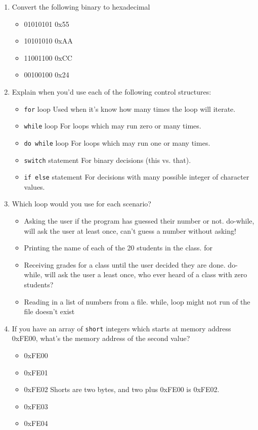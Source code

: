 \documentclass[letter,11pt]{article}
\newcommand*\tick{\item[\Checkmark]}
\newcommand*\fail{\item[\XSolidBrush]}
\begin{document}
\begin{enumerate}
    \item Convert the following binary to hexadecimal
    \begin{itemize}
        \item 01010101 {\color{red}0x55}
        \item 10101010 {\color{red}0xAA}
        \item 11001100 {\color{red}0xCC}
        \item 00100100 {\color{red}0x24}
    \end{itemize}
    
    \item Explain when you'd use each of the following control structures:
    \begin{itemize}
        \item \texttt{for} loop {\color{red}Used when it's know how many times the loop will iterate.}
        \item \texttt{while} loop {\color{red}For loops which may run zero or many times.}
        \item \texttt{do while} loop {\color{red}For loops which may run one or many times.}
        \item \texttt{switch} statement {\color{red}For binary decisions (this vs. that).}
        \item \texttt{if else} statement {\color{red}For decisions with many possible integer of character values.}
    \end{itemize}
    
    \item Which loop would you use for each scenario?
    \begin{itemize}
        \item Asking the user if the program has guessed their number or not. {\color{red}do-while, will ask the user at least once, can't guess a number without asking!}
        \item Printing the name of each of the 20 students in the class. {\color{red}for}
        \item Receiving grades for a class until the user decided they are done. {\color{red}do-while, will ask the user a least once, who ever heard of a class with zero students?}
        \item Reading in a list of numbers from a file. {\color{red}while, loop might not run of the file doesn't exist}
    \end{itemize}
    
    \item If you have an array of \texttt{short} integers which starts at memory address 0xFE00, what's the memory address of the second value?
    \begin{itemize}
        \fail 0xFE00
        \fail 0xFE01
        \tick 0xFE02 {\color{red}Shorts are two bytes, and two plus 0xFE00 is 0xFE02.}
        \fail 0xFE03
        \fail 0xFE04
    \end{itemize}
    

\end{enumerate}
\end{document}
